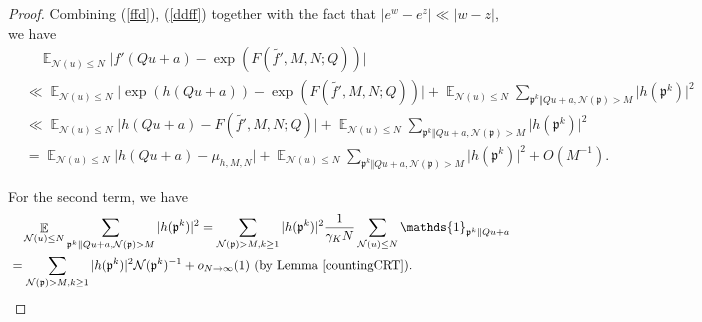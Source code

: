 \documentclass[11pt]{amsart}
\theoremstyle{definition}
\DeclareMathOperator*{\E}{\mathbb{E}}
\newcommand{\N}{{\mathbb N}}
\newcommand{\NN}{{\mathcal N}}
\newcommand{\mf}{\mathfrak}
\begin{document}
\begin{proof}
Combining (\ref{ffd}), (\ref{ddff}) together with the fact that 
  $\vert e^{w}-e^{z}\vert\ll \vert w-z\vert$, we have 
\begin{equation}\label{firstO1Kbound}
    \begin{split}
        &\quad\E_{\NN(u) \leq N}\vert f'(Qu+a)-\exp(F(\tilde{f'},M,N;Q))\vert
        \\&\ll \E_{\NN(u) \leq N}\vert \exp(h(Qu+a))-\exp(F(\tilde{f'},M,N;Q))\vert+\E_{\NN(u) \leq N}\sum_{\mf p^{k}\Vert Qu+a, \NN(\mf p)>M}\vert h(\mf p^{k})\vert^{2}
        \\&\ll \E_{\NN(u) \leq N}\vert h(Qu+a)-F(\tilde{f'},M,N;Q)\vert+\E_{\NN(u) \leq N}\sum_{\mf p^{k}\Vert Qu+a, \NN(\mf p)>M}\vert h(\mf p^{k})\vert^{2}
        \\&=\E_{\NN(u) \leq N}\vert h(Qu+a)-\mu_{h,M,N}\vert+\E_{\NN(u) \leq N}\sum_{\mf p^{k}\Vert Qu+a, \NN(\mf p)>M}\vert h(\mf p^{k})\vert^{2}+O(M^{-1}).
    \end{split}
\end{equation}

For the second term, we have
\begin{equation}\label{204}
    \begin{split}
        &\quad \E_{\NN(u) \leq N}\sum_{\mf p^{k}\Vert Qu+a, \NN(\mf p)>M}\vert h(\mf p^{k})\vert^{2}
        =\sum_{\NN(\mf p)>M, k\geq 1}\vert h(\mf p^{k})\vert^{2}\frac{1}{\gamma_{K} N}\sum_{\NN(u) \leq N}\mathds{1}_{\mf p^{k}\Vert Qu+a}
        \\&=\sum_{\NN(\mf p)>M, k\geq 1}\vert h(\mf p^{k})\vert^{2}\NN(\mf p^{k})^{-1}+o_{N\to\infty}(1) \text{ (by Lemma \ref{countingCRT})}.
    \end{split}
\end{equation}




\end{proof}
\end{document}
